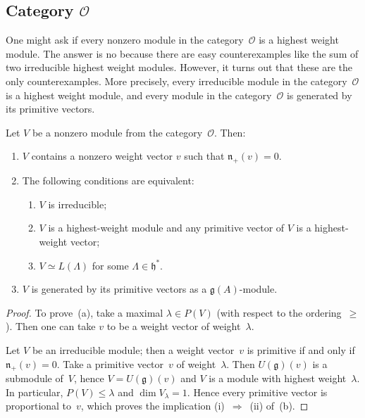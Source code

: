 \documentclass[12pt]{article}
\begin{document}
\subsection{Category $\mathcal{O}$}
One might ask if every nonzero module in the category~$\mathcal{O}$ is a highest weight module. The answer is no because there are easy counterexamples like the sum of two irreducible highest weight modules. However, it turns out that these are the only counterexamples. More precisely, every irreducible module in the category~$\mathcal{O}$ is a highest weight module, and every module in the category~$\mathcal{O}$ is generated by its primitive vectors.
\begin{proposition}[9.3]
    Let $V$ be a nonzero module from the category~$\mathcal{O}$. Then:
    \begin{enumerate}[label=\textup{(\alph*)}]
        \item $V$ contains a nonzero weight vector $v$ such that $\mathfrak{n}_+(v)=0$.
        \item The following conditions are equivalent:
              \begin{enumerate}[label=\textup{(\roman*)}]
                  \item $V$ is irreducible;
                  \item $V$ is a highest-weight module and any primitive vector of $V$
                        is a highest-weight vector;
                  \item $V \simeq L(\Lambda)$ for some $\Lambda \in \mathfrak{h}^*$.
              \end{enumerate}
        \item $V$ is generated by its primitive vectors as a $\mathfrak{g}(A)$-module.
    \end{enumerate}

    \begin{proof}
        To prove~(a), take a maximal $\lambda \in P(V)$ (with respect to the ordering~$\ge$).
        Then one can take $v$ to be a weight vector of weight~$\lambda$.

        Let $V$ be an irreducible module; then a weight vector~$v$ is primitive if and only if
        $\mathfrak{n}_+(v)=0$.  Take a primitive vector~$v$ of weight~$\lambda$.
        Then $U(\mathfrak{g})(v)$ is a submodule of~$V$, hence
        $V = U(\mathfrak{g})(v)$ and $V$ is a module with highest weight~$\lambda$.
        In particular, $P(V) \le \lambda$ and $\dim V_\lambda = 1$.
        Hence every primitive vector is proportional to~$v$, which proves the implication
        \textup{(i)}~$\Rightarrow$~\textup{(ii)} of~(b).


\end{proof}
\end{proposition}
\end{document}
